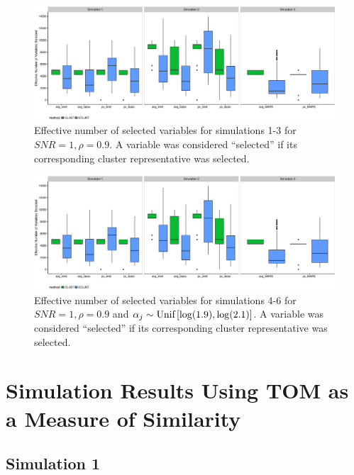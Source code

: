 \begin{appendices}
\begin{figure}[H]
	\centering
	\includegraphics[width=1\linewidth, keepaspectratio]{./figs/guillimin/results/figures/sim4-5-6-combined/Shat_sim123.eps}
	\caption{Effective number of selected variables for simulations 1-3 for $SNR = 1, \rho=0.9$. A variable was considered ``selected'' if its corresponding cluster representative was selected.}
	\label{fig:compare_clusters2}
\end{figure}

\begin{figure}[H]
	\centering
	\includegraphics[width=1\linewidth, keepaspectratio]{./figs/guillimin/results/figures/sim4-5-6-combined/Shat_sim123.eps}
	\caption{Effective number of selected variables for simulations 4-6 for $SNR = 1, \rho=0.9$ and \mbox{$\alpha_{j} \sim \textrm{{Unif}}\left[\log(1.9), \log(2.1)\right]$}. A variable was considered ``selected'' if its corresponding cluster representative was selected.}
	\label{fig:compare_clusters3}
\end{figure}


\section{Simulation Results Using TOM as a Measure of Similarity} \label{ap:sim-TOM}


\subsection*{Simulation 1}


\end{appendices}

